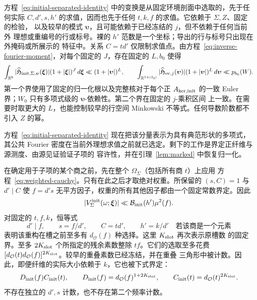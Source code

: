 方程~\eqref{eq:initial-separated-identity} 中的变换是从固定环境剖面中选取的，先于任何实际
\(C,d',s,h'\) 的求值，因而也先于任何 \(t,k,f\) 的求值。它依赖于 \(\Sigma,Z\)、固定的检验，
以及较早的模式 \(\boldsymbol\upsilon\)，且可能依赖于已经冻结的 \(j\)，但不依赖于任何当前外
理想或重编号的行或标号。裸的 \(h'\) 范数是一个坐标；导出的行与标号只出现在外掩码或所展示的
特征中。关系 \(C=td'\) 仅限制求值点。由方程~\eqref{eq:inverse-fourier-moment}，对每个固定的
\(J\)，存在固定的 \(L,b_0\) 使得
\[
 \int_{\mathbb R^6}
 |\widehat{\mathfrak H}_{{\rm init},\Sigma,\boldsymbol\upsilon}
       (\boldsymbol\xi)|(1+|\boldsymbol\xi|)^J\,d\boldsymbol\xi
 \ll (1+|\boldsymbol\upsilon|)^L,\qquad
 \int_{\mathbb R^{1+|I_0|}}|\widehat{\mathfrak H}_{{\rm ov},j}(\boldsymbol\upsilon)|
       (1+|\boldsymbol\upsilon|)^L\,d\boldsymbol\upsilon
 \ll p_{b_0}(W).
\]
第一个界使用了固定的归一化根以及完整核对于每个正 \(A_{{\rm ker},{\rm init}}\) 的一致
Euler 界；\(W_0\) 只有多项式级的 \(\boldsymbol\upsilon\)-依赖性。第二个界在固定的 \(j\)-乘积区间
上一致。在需要时取更大的 \(L\)，也能控制较早的行空间 Minkowski 不等式。任何导数阶数都不
引入 \(Z\) 的幂。

方程~\eqref{eq:initial-separated-identity} 现在把该分量表示为具有典范形状的多项式，其公共
Fourier 密度在当前外理想求值之前就已选定。剩下的工作是界定正纤维与源测度、由源见证验证子项的
容许性，并在引理~\ref{lem:marked} 中恢复归一化。

在确定用于子项的某个商之前，先在整个 \(\Omega_\Sigma\)（包括所有商 \(t\)）上应用
方程~\eqref{eq:weighted-cauchy}。只有在此之后才取绝对权重。所保留的 \((s,C)=1\) 与
\(d'\mid C\) 使 \(f=d's\) 无平方因子，权重的所有其他因子都由一个固定常数界定。因此
\[
 |V_\Sigma^{\rm init}(\omega;\boldsymbol\xi)|
 \ll\mathcal B_{\rm init}(h')\mu^2(f).
\]
对固定的 \(t,f,k\)，恒等式
\[
 d'\mid f,\qquad s=f/d',\qquad C=td',\qquad h'=k/d'
       \quad\text{若该商是一个元素}
\]
表明该重构在槽之前至多有 \(d_{\mathcal O}(f)\) 种选择。这里 \(K_{\rm slot}\) 再次表示原槽数
的固定界。至多 \(2K_{\rm slot}\) 个所指定的残余素数整除 \(tf\)。它们的选取至多花费
\([d_{\mathcal O}(t)d_{\mathcal O}(f)]^{2K_{\rm slot}}\)。较早的重叠素数已经冻结，并在重叠
三角形中被计数。因此，即便纤维的实际大小依赖于 \(k\)，它也被下式界定：
\begin{equation}\label{eq:initial-fibre}
 D_{\rm init}(f)C_{\rm init}(t),\qquad
 D_{\rm init}(f)=d_{\mathcal O}(f)^{1+2K_{\rm slot}},\qquad
 C_{\rm init}(t)=d_{\mathcal O}(t)^{2K_{\rm slot}}.
\end{equation}
不存在独立的 \(d',s\) 计数，也不存在第二个频率计数。

